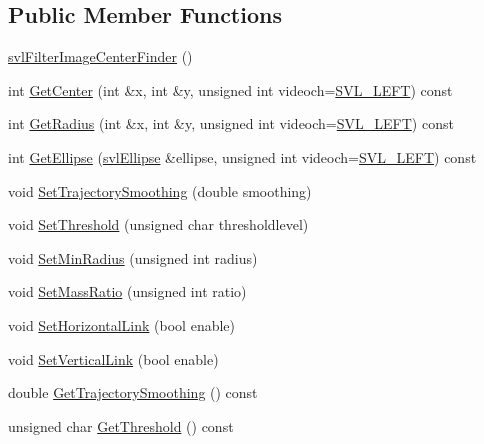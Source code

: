 \subsection*{Public Member Functions}
\begin{DoxyCompactItemize}
\item 
\hyperlink{classsvl_filter_image_center_finder_a37b91737e46cd550687116bdb2ab5aea}{svl\+Filter\+Image\+Center\+Finder} ()
\item 
int \hyperlink{classsvl_filter_image_center_finder_a62b674308e69dc341da21c9936cbce3a}{Get\+Center} (int \&x, int \&y, unsigned int videoch=\hyperlink{svl_definitions_8h_ab9fec7615f19c8df2919eebcab0b187f}{S\+V\+L\+\_\+\+L\+E\+F\+T}) const 
\item 
int \hyperlink{classsvl_filter_image_center_finder_a7b18bd54bfed4578908d1791118c51fe}{Get\+Radius} (int \&x, int \&y, unsigned int videoch=\hyperlink{svl_definitions_8h_ab9fec7615f19c8df2919eebcab0b187f}{S\+V\+L\+\_\+\+L\+E\+F\+T}) const 
\item 
int \hyperlink{classsvl_filter_image_center_finder_ace2664b59ca74314a0552cac25bf21cb}{Get\+Ellipse} (\hyperlink{structsvl_ellipse}{svl\+Ellipse} \&ellipse, unsigned int videoch=\hyperlink{svl_definitions_8h_ab9fec7615f19c8df2919eebcab0b187f}{S\+V\+L\+\_\+\+L\+E\+F\+T}) const 
\item 
void \hyperlink{classsvl_filter_image_center_finder_a99a74a776a5324e000cf8d2582baf11e}{Set\+Trajectory\+Smoothing} (double smoothing)
\item 
void \hyperlink{classsvl_filter_image_center_finder_a4969d25f2f52e0694dfda9dbf991ad8f}{Set\+Threshold} (unsigned char thresholdlevel)
\item 
void \hyperlink{classsvl_filter_image_center_finder_a83680965986de5cda60659a8c4397d19}{Set\+Min\+Radius} (unsigned int radius)
\item 
void \hyperlink{classsvl_filter_image_center_finder_a660622779cc64bfbf749a86622b5612f}{Set\+Mass\+Ratio} (unsigned int ratio)
\item 
void \hyperlink{classsvl_filter_image_center_finder_a15dfd1aac236158f34834f6f06305f54}{Set\+Horizontal\+Link} (bool enable)
\item 
void \hyperlink{classsvl_filter_image_center_finder_a8be260832a0f0ee53c061ed3e1d4b9db}{Set\+Vertical\+Link} (bool enable)
\item 
double \hyperlink{classsvl_filter_image_center_finder_a554f54d6ef5f361d153e875f86a4e611}{Get\+Trajectory\+Smoothing} () const 
\item 
unsigned char \hyperlink{classsvl_filter_image_center_finder_ac8826760dcd1bafafb27a6aa5046a42a}{Get\+Threshold} () const 

\end{DoxyCompactItemize}
